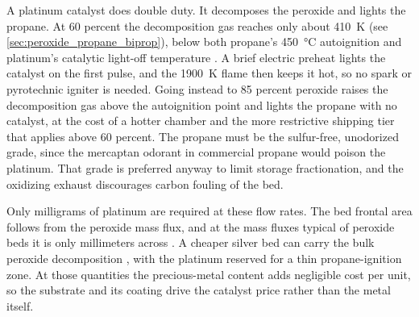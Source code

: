 \documentclass{article}
\begin{document}
A platinum catalyst does double duty. It decomposes the peroxide and lights the propane. At 60 percent the decomposition gas reaches only about \SI{410}{\kelvin} (see \autoref{sec:peroxide_propane_biprop}), below both propane's \SI{450}{\celsius} autoignition \cite{cameo_propane} and platinum's catalytic light-off temperature \cite{cho1986catalytic_ignition}. A brief electric preheat lights the catalyst on the first pulse, and the \SI{1900}{\kelvin} flame then keeps it hot, so no spark or pyrotechnic igniter is needed. Going instead to 85 percent peroxide raises the decomposition gas above the autoignition point and lights the propane with no catalyst, at the cost of a hotter chamber and the more restrictive shipping tier that applies above 60 percent. The propane must be the sulfur-free, unodorized grade, since the mercaptan odorant in commercial propane would poison the platinum. That grade is preferred anyway to limit storage fractionation, and the oxidizing exhaust discourages carbon fouling of the bed.

Only milligrams of platinum are required at these flow rates. The bed frontal area follows from the peroxide mass flux, and at the mass fluxes typical of peroxide beds it is only millimeters across \cite{jung2021catalyst_bed_scaling}. A cheaper silver bed can carry the bulk peroxide decomposition \cite{yang2024microchannel}, with the platinum reserved for a thin propane-ignition zone. At those quantities the precious-metal content adds negligible cost per unit, so the substrate and its coating drive the catalyst price rather than the metal itself.
\end{document}

